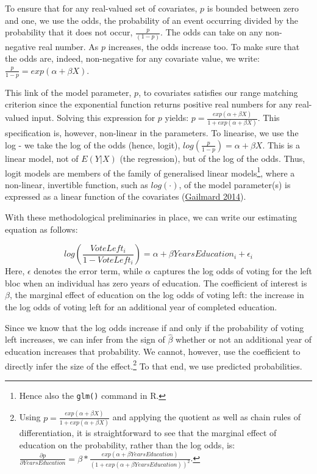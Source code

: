 \documentclass[
]{article}
\begin{document}
To ensure that for any real-valued set of covariates, \(p\) is bounded
between zero and one, we use the odds, the probability of an event
occurring divided by the probability that it does not occur,
\(\frac{p}{(1-p)}\). The odds can take on any non-negative real number.
As \(p\) increases, the odds increase too. To make sure that the odds
are, indeed, non-negative for any covariate value, we write:
\(\frac{p}{1-p} = exp(\alpha + \beta X)\).

This link of the model parameter, \(p\), to covariates satisfies our
range matching criterion since the exponential function returns positive
real numbers for any real-valued input. Solving this expression for
\(p\) yields:
\(p = \frac{exp(\alpha + \beta X)}{1 + exp(\alpha + \beta X)}\). This
specification is, however, non-linear in the parameters. To linearise,
we use the log - we take the log of the odds (hence, logit),
\(log(\frac{p}{1-p}) = \alpha + \beta X\). This is a linear model, not
of \(E(Y|X)\) (the regression), but of the log of the odds. Thus, logit
models are members of the family of generalised linear
models\footnote{Hence also the \texttt{glm()} command in R.}, where a
non-linear, invertible function, such as \(log(\cdot)\), of the model
parameter(s) is expressed as a linear function of the covariates
(\protect\hyperlink{ref-gailmard_statistical_2014}{Gailmard 2014}).

With these methodological preliminaries in place, we can write our
estimating equation as follows:

\[
log(\frac{VoteLeft_{i}}{1-VoteLeft_{i}}) = \alpha + \beta YearsEducation_{i} + \epsilon_{i} 
\] Here, \(\epsilon\) denotes the error term, while \(\alpha\) captures
the log odds of voting for the left bloc when an individual has zero
years of education. The coefficient of interest is \(\beta\), the
marginal effect of education on the log odds of voting left: the
increase in the log odds of voting left for an additional year of
completed education.

Since we know that the log odds increase if and only if the probability
of voting left increases, we can infer from the sign of \(\hat{\beta}\)
whether or not an additional year of education increases that
probability. We cannot, however, use the coefficient to directly infer
the size of the effect.\footnote{Using
  \(p = \frac{exp(\alpha + \beta X)}{1 + exp(\alpha + \beta X)}\) and
  applying the quotient as well as chain rules of differentiation, it is
  straightforward to see that the marginal effect of education on the
  probability, rather than the log odds, is:
  \(\frac{\partial p}{\partial YearsEducation} = \beta*\frac{exp(\alpha + \beta YearsEducation)}{(1+exp(\alpha + \beta YearsEducation))^2}\).}
To that end, we use predicted probabilities.
\end{document}
